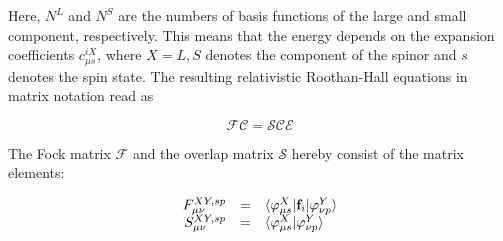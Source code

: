 Here, $N^L$ and $N^S$ are the numbers of basis functions of the large and small
component, respectively. This means that the energy depends on the expansion
coefficients $c_{\mu s}^{iX}$, where $X=L,S$ denotes the component of the spinor and
$s$ denotes the spin state. The resulting relativistic Roothan-Hall equations
in matrix notation read as

\begin{equation}
\mathcal{FC} = \mathcal{SCE}
\end{equation}

The Fock matrix $\mathcal{F}$ and the overlap matrix $\mathcal{S}$
hereby consist of the matrix elements:

\begin{equation}\begin{array}{rcl}\label{roothanm}
F^{XY,sp}_{\mu\nu} &=& \braket{\varphi^X_{\mu s}|\mathbf{f}_i|\varphi_{\nu p}^Y}\\
S^{XY,sp}_{\mu\nu} &=& \braket{\varphi^X_{\mu s}|\varphi_{\nu p}^Y}
\end{array}\end{equation}




